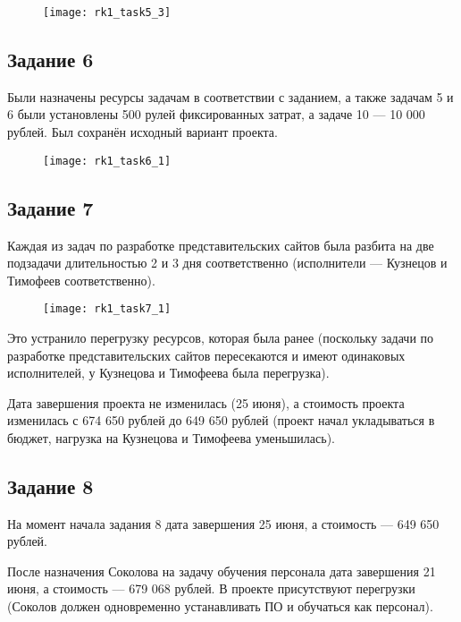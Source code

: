 \begin{figure}[h!]
	\texttt{[image: rk1\_task5\_3]}
\end{figure}

\subsection*{Задание 6}

Были назначены ресурсы задачам в соответствии с заданием, а также задачам 5 и 6 были установлены 500 рулей фиксированных затрат, а задаче 10 --- 10 000 рублей. Был сохранён исходный вариант проекта.

\begin{figure}[h!]
	\texttt{[image: rk1\_task6\_1]}
\end{figure}

\subsection*{Задание 7}

Каждая из задач по разработке представительских сайтов была разбита на две подзадачи длительностью 2 и 3 дня соответственно (исполнители --- Кузнецов и Тимофеев соответственно).

\begin{figure}[h!]
	\texttt{[image: rk1\_task7\_1]}
\end{figure}

Это устранило перегрузку ресурсов, которая была ранее (поскольку задачи по разработке представительских сайтов пересекаются и имеют одинаковых исполнителей, у Кузнецова и Тимофеева была перегрузка).

Дата завершения проекта не изменилась (25 июня), а стоимость проекта изменилась с 674 650 рублей до 649 650 рублей (проект начал укладываться в бюджет, нагрузка на Кузнецова и Тимофеева уменьшилась).

\subsection*{Задание 8}

На момент начала задания 8 дата завершения 25 июня, а стоимость --- 649 650 рублей.

После назначения Соколова на задачу обучения персонала дата завершения 21 июня, а стоимость --- 679 068 рублей. В проекте присутствуют перегрузки (Соколов должен одновременно устанавливать ПО и обучаться как персонал).

